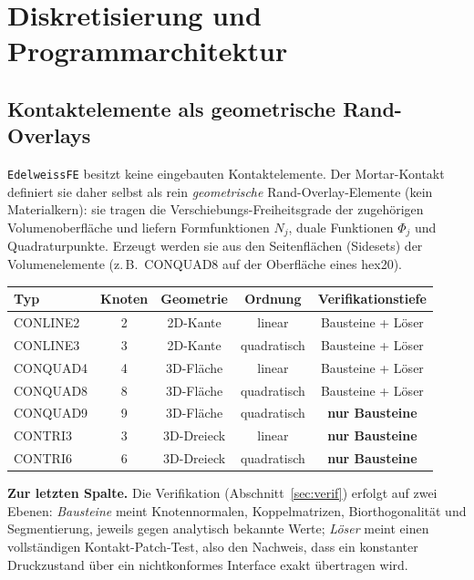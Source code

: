 \documentclass[a4paper,11pt]{article}
\newcommand{\code}[1]{\texttt{\small #1}}
\let\stdsection\section
\renewcommand{\section}{\clearpage\stdsection}
\begin{document}
\section{Diskretisierung und Programmarchitektur}
\label{sec:architektur}

\subsection{Kontaktelemente als geometrische Rand-Overlays}
\code{EdelweissFE} besitzt keine eingebauten Kontaktelemente. Der Mortar-Kontakt definiert sie daher
selbst als rein \emph{geometrische} Rand-Overlay-Elemente (kein Materialkern): sie tragen die
Verschiebungs-Freiheitsgrade der zugehörigen Volumenoberfläche und liefern Formfunktionen $N_j$,
duale Funktionen $\Phi_j$ und Quadraturpunkte. Erzeugt werden sie aus den Seitenflächen (Sidesets)
der Volumenelemente (z.\,B.\ CONQUAD8 auf der Oberfläche eines hex20).

\begin{center}
\small
\begin{tabular}{lcccc}
\toprule
Typ & Knoten & Geometrie & Ordnung & Verifikationstiefe \\
\midrule
CONLINE2 & 2 & 2D-Kante   & linear       & Bausteine + Löser \\
CONLINE3 & 3 & 2D-Kante   & quadratisch  & Bausteine + Löser \\
CONQUAD4 & 4 & 3D-Fläche  & linear       & Bausteine + Löser \\
CONQUAD8 & 8 & 3D-Fläche  & quadratisch  & Bausteine + Löser \\
CONQUAD9 & 9 & 3D-Fläche  & quadratisch  & \textbf{nur Bausteine} \\
CONTRI3  & 3 & 3D-Dreieck & linear       & \textbf{nur Bausteine} \\
CONTRI6  & 6 & 3D-Dreieck & quadratisch  & \textbf{nur Bausteine} \\
\bottomrule
\end{tabular}
\end{center}

\noindent\textbf{Zur letzten Spalte.} Die Verifikation (Abschnitt~\ref{sec:verif}) erfolgt auf
zwei Ebenen: \emph{Bausteine} meint Knotennormalen, Koppelmatrizen, Biorthogonalität und
Segmentierung, jeweils gegen analytisch bekannte Werte; \emph{Löser} meint einen vollständigen
Kontakt-Patch-Test, also den Nachweis, dass ein konstanter Druckzustand über ein nichtkonformes
Interface exakt übertragen wird.
\end{document}
